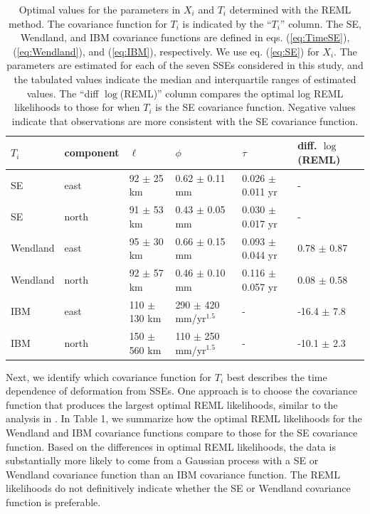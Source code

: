 \documentclass[extra,mreferee]{gji}
\begin{document}
\begin{table}\label{tab:Parameters}
\caption{
Optimal values for the parameters in $X_i$ and $T_i$ determined with
the REML method. The covariance function for $T_i$ is indicated by the
``$T_i$'' column. The SE, Wendland, and IBM covariance functions are
defined in eqs. (\ref{eq:TimeSE}), (\ref{eq:Wendland}), and
(\ref{eq:IBM}), respectively. We use eq. (\ref{eq:SE}) for $X_i$.
The parameters are estimated for each of the seven SSEs considered in
this study, and the tabulated values indicate the median and
interquartile ranges of estimated values. The ``diff $\log$(REML)'' column
compares the optimal log REML likelihoods to those for when $T_i$ is
the SE covariance function. Negative values indicate that observations
are more consistent with the SE covariance function.
} 
\begin{tabular} {l l l l l l}
$T_i$ & component & $\ell$  & $\phi$   & $\tau$  & diff. $\log$(REML) \\ \hline
SE & east   & 92 $\pm$ 25 km  & 0.62 $\pm$ 0.11 mm  & 0.026 $\pm$ 0.011 yr  &  - \\
SE & north  & 91 $\pm$ 53 km  & 0.43 $\pm$ 0.05 mm  & 0.030 $\pm$ 0.017 yr  &  - \\
Wendland & east   & 95 $\pm$ 30 km  & 0.66 $\pm$ 0.15 mm  & 0.093 $\pm$ 0.044 yr &  0.78 $\pm$ 0.87 \\
Wendland & north  & 92 $\pm$ 57 km  & 0.46 $\pm$ 0.10 mm  & 0.116 $\pm$ 0.057 yr &  0.08 $\pm$ 0.58 \\
IBM & east   & 110 $\pm$ 130 km & 290 $\pm$ 420 mm/yr$^{1.5}$  & -          & -16.4 $\pm$ 7.8 \\
IBM & north  & 150 $\pm$ 560 km & 110 $\pm$ 250 mm/yr$^{1.5}$ & -           & -10.1 $\pm$ 2.3 \\
\end{tabular}
\end{table}


Next, we identify which covariance function for $T_i$ best describes
the time dependence of deformation from SSEs. One approach is to
choose the covariance function that produces the largest optimal REML
likelihoods, similar to the analysis in \citet{Langbein2004}. In Table
1, we summarize how the optimal REML likelihoods for the Wendland and
IBM covariance functions compare to those for the SE covariance
function. Based on the differences in optimal REML likelihoods, the
data is substantially more likely to come from a Gaussian process with
a SE or Wendland covariance function than an IBM covariance function.
The REML likelihoods do not definitively indicate whether the SE or
Wendland covariance function is preferable.
\end{document}
